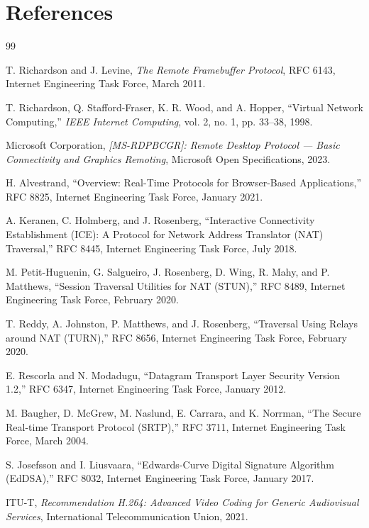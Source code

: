 \chapter*{References}
\thispagestyle{plain}

\begin{thebibliography}{99}
\setlength{\itemsep}{4pt}

 T. Richardson and J. Levine, \emph{The Remote Framebuffer
Protocol}, RFC 6143, Internet Engineering Task Force, March 2011.

 T. Richardson, Q. Stafford-Fraser, K. R. Wood, and A. Hopper,
``Virtual Network Computing,'' \emph{IEEE Internet Computing}, vol. 2, no. 1,
pp. 33--38, 1998.

 Microsoft Corporation, \emph{[MS-RDPBCGR]: Remote Desktop Protocol
--- Basic Connectivity and Graphics Remoting}, Microsoft Open Specifications,
2023.

 H. Alvestrand, ``Overview: Real-Time Protocols for
Browser-Based Applications,'' RFC 8825, Internet Engineering Task Force, January
2021.

 A. Keranen, C. Holmberg, and J. Rosenberg, ``Interactive
Connectivity Establishment (ICE): A Protocol for Network Address Translator
(NAT) Traversal,'' RFC 8445, Internet Engineering Task Force, July 2018.

 M. Petit-Huguenin, G. Salgueiro, J. Rosenberg, D. Wing, R. Mahy,
and P. Matthews, ``Session Traversal Utilities for NAT (STUN),'' RFC 8489,
Internet Engineering Task Force, February 2020.

 T. Reddy, A. Johnston, P. Matthews, and J. Rosenberg,
``Traversal Using Relays around NAT (TURN),'' RFC 8656, Internet Engineering
Task Force, February 2020.

 E. Rescorla and N. Modadugu, ``Datagram Transport Layer Security
Version 1.2,'' RFC 6347, Internet Engineering Task Force, January 2012.

 M. Baugher, D. McGrew, M. Naslund, E. Carrara, and K. Norrman,
``The Secure Real-time Transport Protocol (SRTP),'' RFC 3711, Internet
Engineering Task Force, March 2004.

 S. Josefsson and I. Liusvaara, ``Edwards-Curve Digital
Signature Algorithm (EdDSA),'' RFC 8032, Internet Engineering Task Force,
January 2017.

 ITU-T, \emph{Recommendation H.264: Advanced Video Coding for
Generic Audiovisual Services}, International Telecommunication Union, 2021.


\end{thebibliography}
